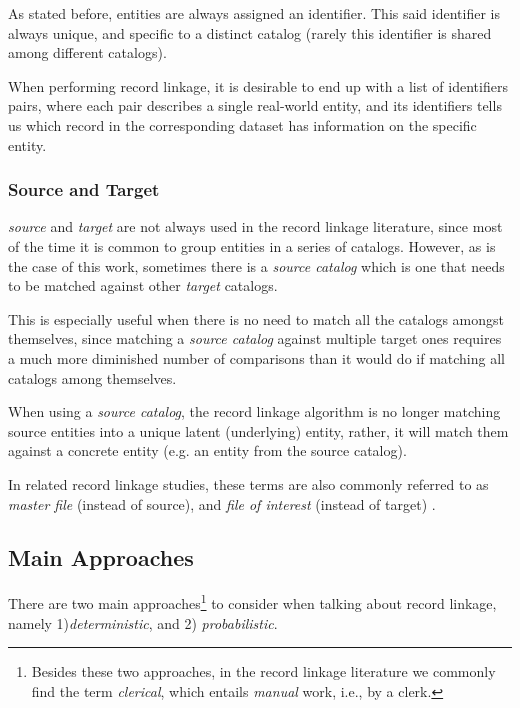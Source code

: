 \documentclass[epsfig,a4paper,11pt,titlepage,twoside,openany]{book}
\begin{document}
\hfill 

As stated before, entities are always assigned an identifier. This said identifier is always unique, and specific to a distinct catalog (rarely this identifier is shared among different catalogs). 

When performing record linkage, it is desirable to end up with a list of identifiers pairs, where each pair describes a single real-world entity, and its identifiers tells us which record in the corresponding dataset has information on the specific entity.


\subsubsection{Source and Target}
\label{sec:rl-term-source-and-target}

\textit{source} and \textit{target} are not always used in the record linkage literature,
since most of the time it is common to group entities in a series of catalogs.
However, as is the case of this work, sometimes there is a \textit{source
  catalog} which is one that needs to be matched against other \textit{target} catalogs.


This is especially useful when there is no need to match all the catalogs amongst
themselves, since matching a \textit{source catalog} against multiple target ones
requires a much more diminished number of comparisons than it would do if matching all catalogs among themselves.

When using a \textit{source catalog}, the record linkage algorithm is no longer matching
source entities into a unique latent (underlying) entity, rather, it will match
them against a concrete entity (e.g. an entity from the source catalog).

In related record linkage studies, these terms are also commonly referred to as \cite{Sayers2015}
\textit{master file} (instead of source), and \textit{file of interest} (instead
of target) .
   


\subsection{Main Approaches}
\label{sec:rl-main-approaches}

There are two main approaches\footnote{Besides these two approaches, in the record linkage literature we commonly find the term \textit{clerical}, which entails \textit{manual} work, i.e., by a clerk.} to consider when talking about record linkage, namely 1)\textit{deterministic}, and 2) \textit{probabilistic}. 
\end{document}
